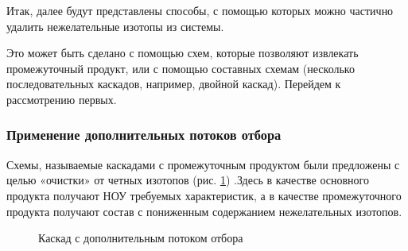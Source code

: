 Итак, далее будут представлены способы, с помощью которых можно частично удалить нежелательные изотопы из системы.

Это может быть сделано с помощью схем, которые позволяют извлекать промежуточный продукт, или с помощью составных схемам (несколько последовательных каскадов, например, двойной каскад).
Перейдем к рассмотрению первых.

\subsubsection{Применение дополнительных потоков отбора}
Схемы, называемые каскадами с промежуточным продуктом были предложены с целью «очистки» от четных изотопов (рис. \ref{fig:3_out}) \cite{palkinAnaliticheskiyRaschetSoderzhaniya2007}.Здесь в качестве основного продукта получают НОУ требуемых характеристик, а в качестве промежуточного продукта получают состав с пониженным содержанием нежелательных изотопов.
\begin{figure}[ht]
  \caption{Каскад с дополнительным потоком отбора}\label{fig:3_out}
\end{figure}

